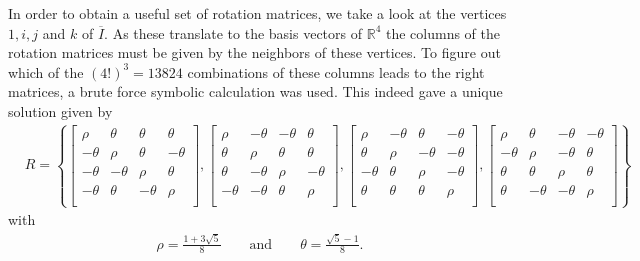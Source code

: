 In order to obtain a useful set of rotation matrices, we take a look at the vertices $1,i,j$ and $k$ of $\overline{I}$. As these translate to the basis vectors of $\mathbb{R}^4$ the columns of the rotation matrices must be given by the neighbors of these vertices. To figure out which of the $(4!)^3 = 13824$ combinations of these columns leads to the right matrices, a brute force symbolic calculation was used. This indeed gave a unique solution given by
\begin{align*}
  & R = \left\{
 \begin{bmatrix}
  \rho    & \theta  & \theta  & \theta  \\
  -\theta & \rho    & \theta  & -\theta \\
  -\theta & -\theta & \rho    & \theta  \\
  -\theta & \theta  & -\theta & \rho    \\
 \end{bmatrix},
 \begin{bmatrix}
  \rho    & -\theta & -\theta & \theta  \\
  \theta  & \rho    & \theta  & \theta  \\
  \theta  & -\theta & \rho    & -\theta \\
  -\theta & -\theta & \theta  & \rho    \\
 \end{bmatrix},
 \begin{bmatrix}
  \rho    & -\theta & \theta  & -\theta \\
  \theta  & \rho    & -\theta & -\theta \\
  -\theta & \theta  & \rho    & -\theta \\
  \theta  & \theta  & \theta  & \rho    \\
 \end{bmatrix},
 \begin{bmatrix}
  \rho    & \theta  & -\theta & -\theta \\
  -\theta & \rho    & -\theta & \theta  \\
  \theta  & \theta  & \rho    & \theta  \\
  \theta  & -\theta & -\theta & \rho    \\
 \end{bmatrix}
 \right\}
\end{align*}
with
\begin{align*}                                                                   \rho = \frac{1 + 3\sqrt{5}}{8} \qquad \textrm{and} \qquad \theta = \frac{\sqrt{5}-1}{8} \textrm{.}
\end{align*}
